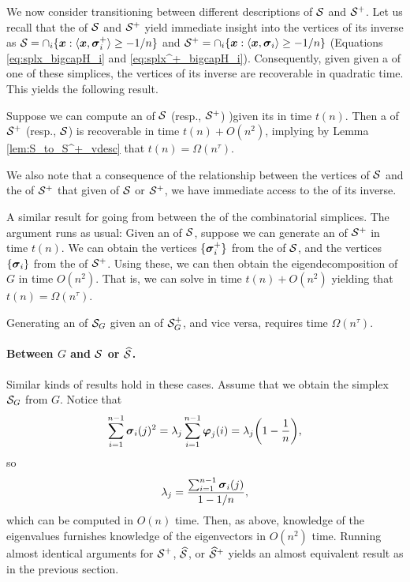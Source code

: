  We now consider transitioning between different descriptions of $\mathcal{S}$ and $\mathcal{S}^+$. Let us recall that the \hdesc of $\mathcal{S}$ and $\mathcal{S}^+$ yield immediate insight into the vertices of its inverse as $\mathcal{S}=\cap_i \{\vb*{x}:\langle \vb*{x},\vb*{\sigma}_i^+\rangle \geq -1/n\}$ and $\mathcal{S}^+=\cap_i\{\vb*{x}:\langle\vb*{x},\vb*{\sigma}_i\rangle \geq -1/n\}$ (Equations \eqref{eq:splx_bigcapH_i} and \eqref{eq:splx^+_bigcapH_i}). Consequently, given given a \hdesc of one of these simplices, the vertices of its inverse are recoverable in quadratic time. This yields the following result. 
 
 \begin{lemma}
 	\label{lem:S_vdesc_to_hdesc}
	 Suppose we can compute an \hdesc of $\mathcal{S}$ (resp., $\mathcal{S}^+$) )given its \vdesc in time $t(n)$. Then a \vdesc of $\mathcal{S}^+$ (resp., $\mathcal{S}$) is recoverable in time $t(n) + O(n^2)$, implying by Lemma \ref{lem:S_to_S^+_vdesc} that $t(n) = \Omega(n^\tau)$. 
 \end{lemma}

We also note that a consequence of the relationship between the vertices of $\mathcal{S}$ and the \hdesc of $\mathcal{S}^+$ that given \vdesc of $\mathcal{S}$ or $\mathcal{S}^+$, we have immediate access to the \hdesc of its inverse. 

A similar result for going from between the \hdesc of the combinatorial simplices. The argument runs as usual: Given an \hdesc of $\mathcal{S}$, suppose we can generate an \hdesc of $\mathcal{S}^+$ in time $t(n)$. We can obtain the vertices $\{\vb*{\sigma}_i^+\}$ from the \hdesc of $\mathcal{S}$, and the vertices $\{\vb*{\sigma}_i\}$ from the \hdesc of $\mathcal{S}^+$. Using these, we can then obtain the eigendecomposition of $G$ in time $O(n^2)$. That is, we can solve \lapdecomp in time $t(n) + O(n^2)$ yielding that $t(n) = \Omega(n^\tau)$. 

\begin{lemma}
	\label{lem:hdesc_to_hdesc}
	Generating an \hdesc of $\mathcal{S}_G$ given an \hdesc of $\mathcal{S}_G^+$, and vice versa, requires time $\Omega(n^\tau)$. 
\end{lemma}


\paragraph{Between \texorpdfstring{$G$}{the graph} and \texorpdfstring{$\mathcal{S}$ or $\widehat{\mathcal{S}}$}{its simplices}.}
Similar kinds of results hold  in these cases. Assume that we obtain  the simplex $\mathcal{S}_G$ from $G$. Notice  that \[\sum_{i=1}^{n-1}   \vb*{\sigma}_i(j)^2 = \lambda_j \sum_{i=1}^{n-1} \vb*{\varphi}_j(i) = \lambda_j\bigg(1-\frac{1}{n}\bigg),\]
so 
\[\lambda_j = \frac{\sum_{i=1}^{n-1}\vb*{\sigma}_i(j)}{1-1/n},\]
which can be computed  in $O(n)$  time. Then, as above, knowledge of the eigenvalues furnishes knowledge  of the eigenvectors in $O(n^2)$ time. Running almost identical arguments for $\mathcal{S}^+$, $\widehat{\mathcal{S}}$, or $\widehat{\mathcal{S}}^+$ yields an almost equivalent result as in the previous section.  

